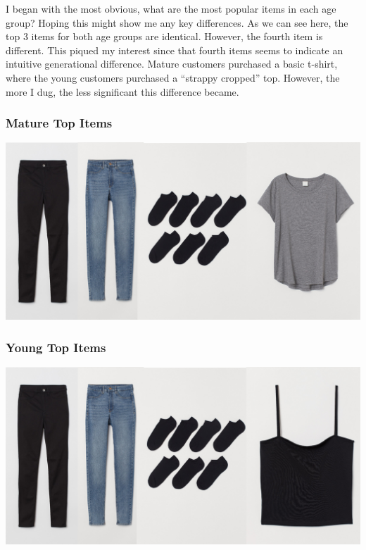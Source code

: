 \documentclass[
]{article}
\begin{document}
I began with the most obvious, what are the most popular items in each
age group? Hoping this might show me any key differences. As we can see
here, the top 3 items for both age groups are identical. However, the
fourth item is different. This piqued my interest since that fourth
items seems to indicate an intuitive generational difference. Mature
customers purchased a basic t-shirt, where the young customers purchased
a ``strappy cropped'' top. However, the more I dug, the less significant
this difference became.

\hypertarget{mature-top-items}{%
\subsubsection{Mature Top Items}\label{mature-top-items}}

\includegraphics{images/MATURE_top_items.jpg}

\hypertarget{young-top-items}{%
\subsubsection{Young Top Items}\label{young-top-items}}

\includegraphics{images/YOUNG_top_items.jpg}
\end{document}
